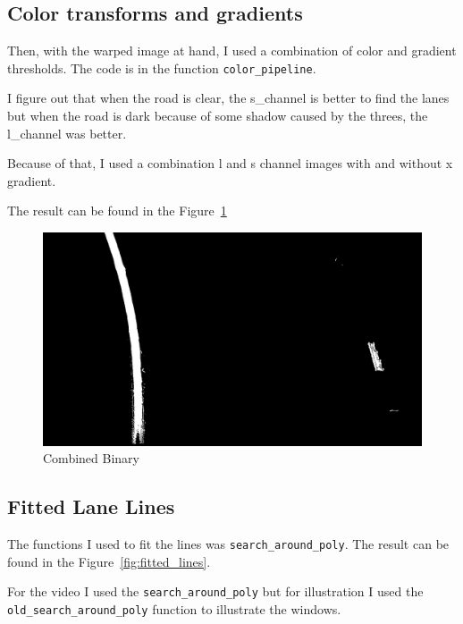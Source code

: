 \documentclass[11pt, a4paper]{article}
\begin{document}
\subsection{Color transforms and gradients}%
\label{sub:color_transforms_and_gradients}


Then, with the warped image at hand, I used a combination of color and gradient thresholds. The code is in the function \texttt{color\_pipeline}.


I figure out that when the road is clear, the s\_channel is better to find the lanes but when the road is dark because of some shadow caused by the threes, the l\_channel was better. 

Because of that, I used a combination l and s channel images with and without x gradient.

The result can be found in the Figure~\ref{fig:combined_binary}



\begin{figure}[htb!]
	\centering
	\includegraphics[width=0.8\linewidth]{combined_binary}
	\caption{Combined Binary}
	\label{fig:combined_binary}
\end{figure}




\subsection{Fitted Lane Lines}%
\label{sub:fitted_lane_lines}

The functions I used to fit the lines was \texttt{search\_around\_poly}. The result can be found in the Figure~\ref{fig:fitted_lines}.




For the video I used the \texttt{search\_around\_poly} but for illustration I used the \texttt{old\_search\_around\_poly} function to illustrate the windows. 
\end{document}
